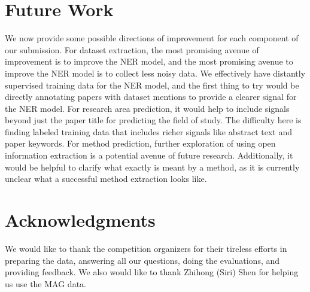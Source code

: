 \documentclass[11pt]{article}
\begin{document}
\section{Future Work}
We now provide some possible directions of improvement for each component of our submission. For dataset extraction, the most promising avenue of improvement is to improve the NER model, and the most promising avenue to improve the NER model is to collect less noisy data. We effectively have distantly supervised training data for the NER model, and the first thing to try would be directly annotating papers with dataset mentions to provide a clearer signal for the NER model. For research area prediction, it would help to include signals beyond just the paper title for predicting the field of study. The difficulty here is finding labeled training data that includes richer signals like abstract text and paper keywords. For method prediction, further exploration of using open information extraction is a potential avenue of future research. Additionally, it would be helpful to clarify what exactly is meant by a method, as it is currently unclear what a successful method extraction looks like.

\section*{Acknowledgments}
We would like to thank the competition organizers for their tireless efforts in preparing the data, answering all our questions, doing the evaluations, and providing feedback.
We also would like to thank Zhihong (Siri) Shen for helping us use the MAG data.




\end{document}
